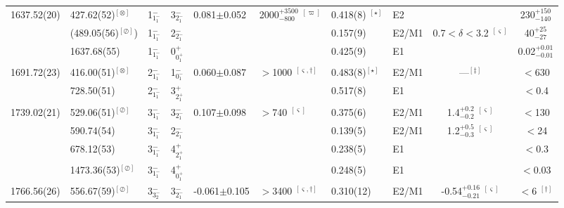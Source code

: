 \begin{landscape}
\begin{center}
\begin{longtable}{clllllllcc}
 1637.52(20)&   427.62(52)$^{[\otimes]}$ & 1$^-_{1^-_1}$ & 3$^-_{2^-_1}$      &0.081$\pm$0.052& 2000$^{+3500}_{-800}$ $^{[\varpi]}$        &0.418(8) $^{[\star]}$& E2                                 && 230$^{+150}_{-140}$                    \\
            &  (489.05(56)$^{[\oslash]}$)& 1$^-_{1^-_1}$ & 2$^-_{2^-_1}$      &&                                                            &0.157(9)             & E2/M1 &  0.7$<\delta<$3.2 $^{[\varsigma]}$       & 40$^{+25}_{-27}$           \\
            &  1637.68(55)               & 1$^-_{1^-_1}$ & 0$^+_{0^+_1}$      &&                                                            &0.425(9)             & E1    &                                      & 0.02$^{+0.01}_{-0.01}$              \\ 
 1691.72(23)&   416.00(51)$^{[\otimes]}$ & 2$^-_{1^-_1}$ & 1$^-_{0^-_1}$      &0.060$\pm$0.087& $>$1000 $^{[\varsigma,\dagger]}$                &0.483(8)$^{[\star]}$ & E2/M1 & ---$^{[\ddagger]}$                   & $<$630  \\
            &   728.50(51)               & 2$^-_{1^-_1}$ & 3$^+_{2^+_1}$      &&                                                            &0.517(8)             & E1    &                                      & $<$0.4  \\  
 1739.02(21)&   529.06(51)$^{[\oslash]}$ & 3$^-_{1^-_1}$ & 3$^-_{2^-_1}$      &0.107$\pm$0.098& $>$740 $^{[\varsigma]}$                         &0.375(6)             & E2/M1 & 1.4$^{+0.2}_{-0.2}$ $^{[\varsigma]}$     & $<$130 \\
            &   590.74(54)               & 3$^-_{1^-_1}$ & 2$^-_{2^-_1}$      &&                                                            &0.139(5)             & E2/M1 & 1.2$^{+0.5}_{-0.3}$ $^{[\varsigma]}$     & $<$24 \\
            &   678.12(53)               & 3$^-_{1^-_1}$ & 4$^+_{2^+_1}$      &&                                                            &0.238(5)             & E1    &                                      & $<$0.3 \\
            &  1473.36(53)$^{[\oslash]}$ & 3$^-_{1^-_1}$ & 4$^+_{0^+_1}$      &&                                                            &0.248(5)             & E1    &                                      & $<$0.03 \\ \hline
 1766.56(26)&   556.67(59)$^{[\oslash]}$ & 3$^-_{3^-_2}$ & 3$^-_{2^-_1}$      &-0.061$\pm$0.105& $>$3400 $^{[\varsigma,\dagger]}$               &0.310(12)            & E2/M1 & -0.54$^{+0.16}_{-0.21}$ $^{[\varsigma]}$ & $<$6 $^{[\dagger]}$    \\

\end{longtable}
\end{center}
\end{landscape}
